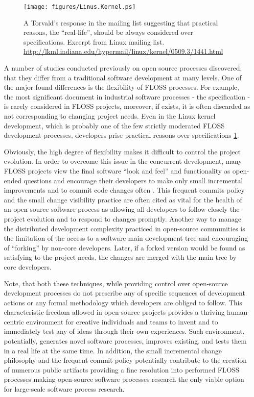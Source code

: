 \begin{figure}[ht!]
   \centering
   \texttt{[image: figures/Linus.Kernel.ps]}
   \caption{A Torvald's response in the mailing list suggesting that practical reasons, the ``real-life'', 
   should be always considered over specifications.
   Excerpt from Linux mailing list. \url{http://lkml.indiana.edu/hypermail/linux/kernel/0509.3/1441.html}}
   \label{fig:kernel}
\end{figure}

A number of studies conducted previously on open source processes discovered, that they differ from a 
traditional software development at many levels. 
One of the major found differences is the flexibility of FLOSS processes. 
For example, the most significant document in industrial software processes - the specification - is rarely 
considered in FLOSS projects, moreover, if exists, it is often discarded as not corresponding to changing 
project needs. 
Even in the Linux kernel development, which is probably one of the few strictly moderated FLOSS development 
processes, developers prise practical reasons over specifications \ref{fig:kernel}.

Obviously, the high degree of flexibility makes it difficult to control the project evolution. 
In order to overcome this issue in the concurrent development, many FLOSS projects view the final 
software ``look and feel'' and functionality as open-ended questions and encourage their developers to 
make only small incremental improvements and to commit code changes often 
\cite{so-checkin} \cite{git-best-practices1}. This frequent commits policy and the small change visibility 
practice are often cited as vital for the health of an open-source software process as allowing all developers 
to follow closely the project evolution and to respond to changes promptly.
Another way to manage the distributed development complexity practiced in open-source communities is the 
limitation of the access to a software main development tree and encouraging of ``forking'' by non-core developers. 
Later, if a forked version would be found as satisfying to the project needs, the changes are merged with the 
main tree by core developers.

Note, that both these techniques, while providing control over open-source development processes do not prescribe 
any of specific sequences of development actions or any formal methodology which developers are obliged to follow.
This characteristic freedom allowed in open-source projects provides a thriving human-centric environment for 
creative individuals and teams to invent and to immediately test any of ideas through their own experiences. 
Such environment, potentially, generates novel software processes, improves existing, and tests them in a real life
at the same time. 
In addition, the small incremental change philosophy and the frequent commit policy potentially contribute to the 
creation of numerous public artifacts providing a fine resolution into performed FLOSS processes making open-source 
software processes research the only viable option for large-scale software process research.

